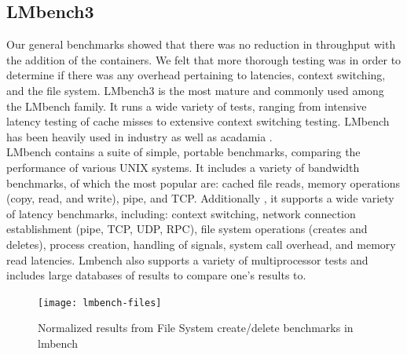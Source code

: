\subsection{LMbench3}
Our general benchmarks showed that there was no reduction in throughput with the addition of the containers.  We felt that more thorough testing was in order to determine if there was any overhead pertaining to latencies, context switching, and the file system.  LMbench3 is the most mature and commonly used among the LMbench family.  It runs a wide variety of tests, ranging from intensive latency testing of cache misses to extensive context switching testing.  LMbench has been heavily used in industry as well as acadamia \cite{lmbench}. \\

LMbench contains a suite of simple, portable benchmarks, comparing the performance of various UNIX systems.  It includes a variety of bandwidth benchmarks, of which the most popular are: cached file reads, memory operations (copy, read, and write), pipe, and TCP.  Additionally , it supports a wide variety of latency benchmarks, including: context switching, network connection establishment (pipe, TCP, UDP, RPC), file system operations (creates and deletes), process creation, handling of signals, system call overhead, and memory read latencies.  Lmbench also supports a variety of multiprocessor tests and includes large databases of results to compare one's results to. \cite{lmbench_paper}

\begin{figure}[bth]
\centering
\texttt{[image: lmbench-files]}
\caption{Normalized results from File System create/delete benchmarks in lmbench}
\label{fig:lmbench-files}
\end{figure}
